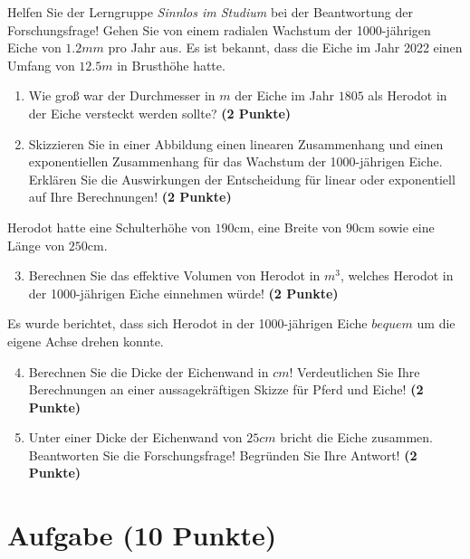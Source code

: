 \documentclass[a4paper, 9pt]{scrartcl}\usepackage[]{graphicx}\usepackage[]{xcolor}
\begin{document}
\vspace{1Ex}

Helfen Sie der Lerngruppe \textit{Sinnlos im Studium} bei der Beantwortung der Forschungsfrage! Gehen Sie von einem radialen Wachstum der 1000-jährigen Eiche von $1.2mm$ pro Jahr aus. Es ist bekannt, dass die Eiche im Jahr 2022 einen Umfang von $12.5m$ in Brusthöhe hatte.

\begin{enumerate}
\item Wie groß war der Durchmesser in $m$ der Eiche im Jahr $1805$ als Herodot in der Eiche versteckt werden sollte? \textbf{(2 Punkte)}
\item Skizzieren Sie in einer Abbildung einen linearen Zusammenhang und einen exponentiellen Zusammenhang für das Wachstum der 1000-jährigen Eiche. Erklären Sie die Auswirkungen der Entscheidung für linear oder exponentiell auf Ihre Berechnungen! \textbf{(2 Punkte)}
\end{enumerate}
 
Herodot hatte eine Schulterhöhe von $190$cm, eine Breite von $90$cm sowie eine Länge von  $250$cm.

\begin{enumerate}
  \setcounter{enumi}{2}
\item Berechnen Sie das effektive Volumen von Herodot in $m^3$, welches Herodot in der 1000-jährigen Eiche einnehmen würde! \textbf{(2 Punkte)}
\end{enumerate}

Es wurde berichtet, dass sich Herodot in der 1000-jährigen Eiche $bequem$ um die eigene Achse drehen konnte.

\begin{enumerate}
  \setcounter{enumi}{3}
\item Berechnen Sie die Dicke der Eichenwand in $cm$! Verdeutlichen Sie Ihre Berechnungen an einer aussagekräftigen Skizze für Pferd und Eiche! \textbf{(2 Punkte)} 
\item Unter einer Dicke der Eichenwand von $25cm$ bricht die Eiche zusammen. Beantworten Sie die Forschungsfrage! Begründen Sie Ihre Antwort! \textbf{(2 Punkte)} 
\end{enumerate}
 
\clearpage

\section{Aufgabe \hfill (10 Punkte)}
\end{document}
